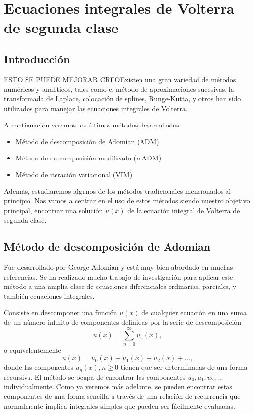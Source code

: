 \chapter{Ecuaciones integrales de Volterra de segunda clase}

\section{Introducción}
ESTO SE PUEDE MEJORAR CREOExisten una gran variedad de métodos numéricos y analíticos, tales como el método de aproximaciones sucesivas, la transformada de Laplace, colocación de splines, Runge-Kutta, y otros han sido utilizados para manejar las ecuaciones integrales de Volterra.

A continuación veremos los últimos métodos desarrollados:
\begin{itemize}
	\item Método de descomposición de Adomian (ADM)
	\item Método de descomposición modificado (mADM)
	\item Método de iteración variacional (VIM)
\end{itemize}
Además, estudiaremos algunos de los métodos tradicionales mencionados al principio. Nos vamos a centrar en el uso de estos métodos siendo nuestro objetivo principal, encontrar una solución $u(x)$ de la ecuación integral de Volterra de segunda clase.
\section{Método de descomposición de Adomian}
Fue desarrollado por George Adomian y está muy bien abordado en muchas referencias. Se ha realizado mucho trabajo de investigación para aplicar este método a una amplia clase de ecuaciones diferenciales ordinarias, parciales, y también ecuaciones integrales.

Consiste en descomponer una función $u(x)$ de cualquier ecuación en una suma de un número infinito de componentes definidas por la serie de descomposición
\begin{equation}\label{eq:sum_adomian}
	u(x) = \sum_{n=0}^{\infty} u_n(x),
\end{equation} 
o equivalentemente 
\begin{equation}
	u(x) = u_0(x) + u_1(x) + u_2(x) + ... ,
\end{equation} 
donde las componentes $u_n(x), n \geqslant 0$ tienen que ser determinadas de una forma recursiva. El método se ocupa de encontrar las componentes $u_0, u_1, u_2, ...$ individualmente. Como ya veremos más adelante, se pueden encontrar estas componentes de una forma sencilla a través de una relación de recurrencia que normalmente implica integrales simples que pueden ser fácilmente evaluadas.

